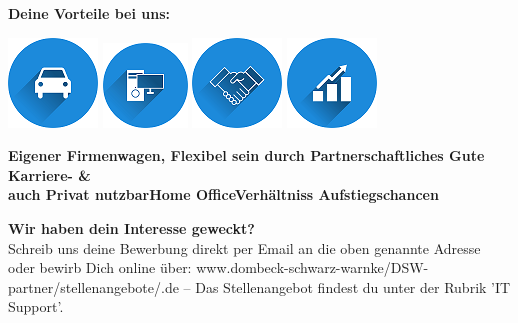 \documentclass[12pt,utf8]{scrartcl}
\begin{document}
\begin{center}
	\textbf{Deine Vorteile bei uns:}
\end{center}

\begin{center}
	\includegraphics{images/auto}\label{fig:auto}\hspace{1,5cm}
	\includegraphics{images/home}\label{fig:home}\hspace{1,5cm}	
	\includegraphics{images/handshake}\label{fig:handshake}\hspace{1,5cm}		
	\includegraphics{images/statistics}\label{fig:statistics}  
\end{center}
\hspace{0,3cm}\textbf{Eigener Firmenwagen,\hspace{0,7cm} Flexibel sein durch \hspace{0,9cm}Partnerschaftliches \hspace{1,1cm}Gute Karriere- \& \\ \hspace{0,4cm}auch Privat nutzbar\hspace{1,5cm}Home Office\hspace{2,1cm}Verhältniss \hspace{2cm}Aufstiegschancen} 			

\vspace{1cm}
\textbf{Wir haben dein Interesse geweckt?}\\
Schreib uns deine Bewerbung direkt per Email an die oben genannte Adresse oder bewirb Dich online über: www.dombeck-schwarz-warnke/DSW-partner/stellenangebote/.de – Das Stellenangebot findest du unter der Rubrik 'IT Support'.

\normalsize
\newpage
{}
\begin{flushleft}

\end{flushleft}
\end{document}

